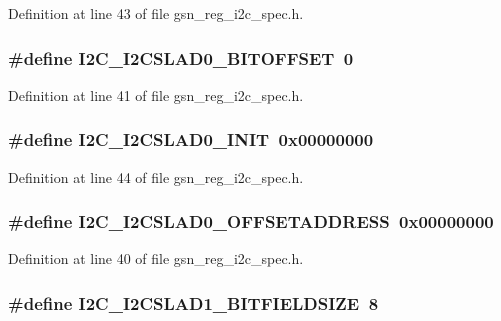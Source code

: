 Definition at line 43 of file gsn\_\-reg\_\-i2c\_\-spec.h.

\hypertarget{a00558_ac112a9407cb305ad60d5abf648a3effe}{
\subsubsection[{I2C\_\-I2CSLAD0\_\-BITOFFSET}]{\setlength{\rightskip}{0pt plus 5cm}\#define I2C\_\-I2CSLAD0\_\-BITOFFSET~0}}
\label{a00558_ac112a9407cb305ad60d5abf648a3effe}


Definition at line 41 of file gsn\_\-reg\_\-i2c\_\-spec.h.

\hypertarget{a00558_a610cadb277ae3856ef9e98bcaf0a828f}{
\subsubsection[{I2C\_\-I2CSLAD0\_\-INIT}]{\setlength{\rightskip}{0pt plus 5cm}\#define I2C\_\-I2CSLAD0\_\-INIT~0x00000000}}
\label{a00558_a610cadb277ae3856ef9e98bcaf0a828f}


Definition at line 44 of file gsn\_\-reg\_\-i2c\_\-spec.h.

\hypertarget{a00558_acb6be668f1ee4393562a6dc25e2e293e}{
\subsubsection[{I2C\_\-I2CSLAD0\_\-OFFSETADDRESS}]{\setlength{\rightskip}{0pt plus 5cm}\#define I2C\_\-I2CSLAD0\_\-OFFSETADDRESS~0x00000000}}
\label{a00558_acb6be668f1ee4393562a6dc25e2e293e}


Definition at line 40 of file gsn\_\-reg\_\-i2c\_\-spec.h.

\hypertarget{a00558_ac8fba42c860195f031fa9e7fe9b1728c}{
\subsubsection[{I2C\_\-I2CSLAD1\_\-BITFIELDSIZE}]{\setlength{\rightskip}{0pt plus 5cm}\#define I2C\_\-I2CSLAD1\_\-BITFIELDSIZE~8}}
\label{a00558_ac8fba42c860195f031fa9e7fe9b1728c}


